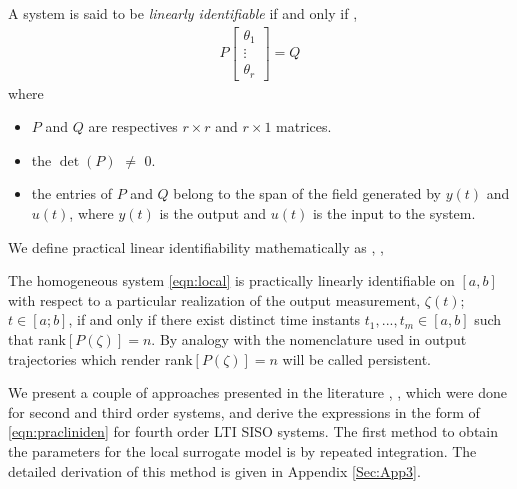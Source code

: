 \documentclass[letterpaper%
, twoside%
, 12pt%
,memoire%
, english%
,creativecommons,hyperref%
]{thETS}
\begin{document}
\par A system is said to be \textit{linearly identifiable} if and only if \citep{fliess2003algebraic}, 
\begin{equation}\label{eqn:pracliniden}
\begin{split}
P\begin{bmatrix} \theta_1 \\ \vdots \\ \theta_r \end{bmatrix} = Q
\end{split}
\end{equation}
where
\begin{itemize}
\item $P$ and $Q$ are respectives $r \times r$ and $r \times 1$ matrices.
\item the $\det(P)$ $\neq$ $0$. 
\item the entries of $P$ and $Q$ belong to the span of the field generated by $y(t)$ and $u(t)$, where $y(t)$ is the output and $u(t)$ is the input to the system.
\end{itemize}
We define practical linear identifiability mathematically as \citep{pandey2018variational}, \citep{fliess2003algebraic}, 
\begin{definition}
The homogeneous system \eqref{eqn:local} is practically linearly identifiable on $[a, b]$ with respect to a particular realization of the output measurement, $\zeta(t)$; $t \in [a; b]$, if and only if there exist distinct time instants $t_1,..., t_m \in [a, b]$ such that rank$[P(\zeta)] = n$. By analogy with the nomenclature used in \citep{fliess2003algebraic} output trajectories which render rank$[P(\zeta)] = n$ will be called persistent.
\end{definition}
We present a couple of approaches presented in the literature \citep{fliess2003algebraic}, \citep{ghoshal2017using}, which were done for second and third order systems, and derive the expressions in the form of \eqref{eqn:pracliniden} for fourth order LTI SISO systems. The first method to obtain the parameters for the local surrogate model is by repeated integration. The detailed derivation of this method is given in Appendix \ref{Sec:App3}.
\end{document}
